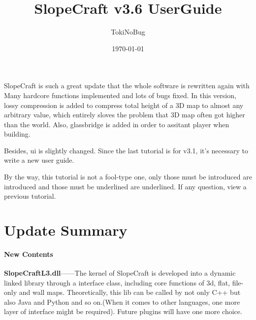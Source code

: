 \documentclass{article}
\title{SlopeCraft v3.6 UserGuide}
\author{TokiNoBug}
\date{\today}
\begin{document}
    \maketitle
    SlopeCraft is such a great update that the whole software is rewritten again with Many hardcore functions implemented and lots of bugs fixed. In this version, lossy compression is added to compress total height of a 3D map to almost any arbitrary value, which entirely sloves the problem that 3D map often got higher than the world. Also, glassbridge is added in order to assitant player when building.
    
    Besides, ui is slightly changed. Since the last tutorial is for v3.1, it's necessary to write a new user guide.

    By the way, this tutorial is not a fool-type one, only those must be introduced are introduced and those must be underlined are underlined. If any question, view a previous tutorial.

    \pagebreak
    \section{Update Summary}
    \paragraph{New Contents}

    \textbf{SlopeCraftL3.dll}——The kernel of SlopeCraft is developed into a dynamic linked library through a interface class, including core functions of 3d, flat, file-only and wall maps. Theoretically, this lib can be called by not only C++ but also Java and Python and so on.(When it comes to other languages, one more layer of interface might be required). Future plugins will have one more choice.
\end{document}
